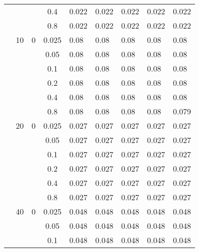 \begin{longtable}{|l|l|l|c|l|l|l|l|l|}
\cmidrule{4-9} &     &          & 0.4            & 0.022      & 0.022      & 0.022      & 0.022      & 0.022      \\
\cmidrule{4-9} &     &          & 0.8            & 0.022      & 0.022      & 0.022      & 0.022      & 0.022      \\
\cmidrule{2-9} & 10  & 0        & 0.025          & 0.08       & 0.08       & 0.08       & 0.08       & 0.08       \\
\cmidrule{4-9} &     &          & 0.05           & 0.08       & 0.08       & 0.08       & 0.08       & 0.08       \\
\cmidrule{4-9} &     &          & 0.1            & 0.08       & 0.08       & 0.08       & 0.08       & 0.08       \\
\cmidrule{4-9} &     &          & 0.2            & 0.08       & 0.08       & 0.08       & 0.08       & 0.08       \\
\cmidrule{4-9} &     &          & 0.4            & 0.08       & 0.08       & 0.08       & 0.08       & 0.08       \\
\cmidrule{4-9} &     &          & 0.8            & 0.08       & 0.08       & 0.08       & 0.08       & 0.079      \\
\cmidrule{2-9} & 20  & 0        & 0.025          & 0.027      & 0.027      & 0.027      & 0.027      & 0.027      \\
\cmidrule{4-9} &     &          & 0.05           & 0.027      & 0.027      & 0.027      & 0.027      & 0.027      \\
\cmidrule{4-9} &     &          & 0.1            & 0.027      & 0.027      & 0.027      & 0.027      & 0.027      \\
\cmidrule{4-9} &     &          & 0.2            & 0.027      & 0.027      & 0.027      & 0.027      & 0.027      \\
\cmidrule{4-9} &     &          & 0.4            & 0.027      & 0.027      & 0.027      & 0.027      & 0.027      \\
\cmidrule{4-9} &     &          & 0.8            & 0.027      & 0.027      & 0.027      & 0.027      & 0.027      \\
\cmidrule{2-9} & 40  & 0        & 0.025          & 0.048      & 0.048      & 0.048      & 0.048      & 0.048      \\
\cmidrule{4-9} &     &          & 0.05           & 0.048      & 0.048      & 0.048      & 0.048      & 0.048      \\
\cmidrule{4-9} &     &          & 0.1            & 0.048      & 0.048      & 0.048      & 0.048      & 0.048      \\

\end{longtable}

